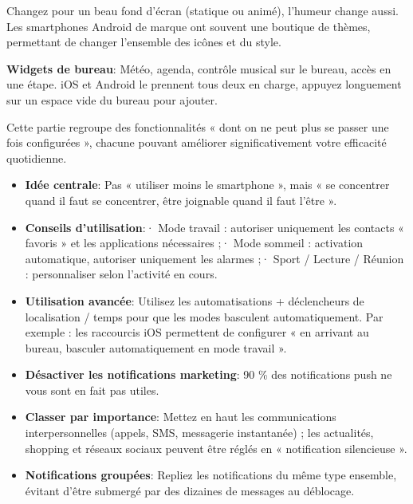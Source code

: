 
Changez pour un beau fond d'écran (statique ou animé), l'humeur change aussi. Les smartphones Android de marque ont souvent une boutique de thèmes, permettant de changer l'ensemble des icônes et du style.

\textbf{Widgets de bureau}: Météo, agenda, contrôle musical sur le bureau, accès en une étape. iOS et Android le prennent tous deux en charge, appuyez longuement sur un espace vide du bureau pour ajouter.


Cette partie regroupe des fonctionnalités « dont on ne peut plus se passer une fois configurées », chacune pouvant améliorer significativement votre efficacité quotidienne.


\begin{itemize}
  \item \textbf{Idée centrale}: Pas « utiliser moins le smartphone », mais « se concentrer quand il faut se concentrer, être joignable quand il faut l'être ».
  \item \textbf{Conseils d'utilisation}:\newline · Mode travail : autoriser uniquement les contacts « favoris » et les applications nécessaires ;\newline · Mode sommeil : activation automatique, autoriser uniquement les alarmes ;\newline · Sport / Lecture / Réunion : personnaliser selon l'activité en cours.
  \item \textbf{Utilisation avancée}: Utilisez les automatisations + déclencheurs de localisation / temps pour que les modes basculent automatiquement. Par exemple : les raccourcis iOS permettent de configurer « en arrivant au bureau, basculer automatiquement en mode travail ».
\end{itemize}


\begin{itemize}
  \item \textbf{Désactiver les notifications marketing}: 90 \% des notifications push ne vous sont en fait pas utiles.
  \item \textbf{Classer par importance}: Mettez en haut les communications interpersonnelles (appels, SMS, messagerie instantanée) ; les actualités, shopping et réseaux sociaux peuvent être réglés en « notification silencieuse ».
  \item \textbf{Notifications groupées}: Repliez les notifications du même type ensemble, évitant d'être submergé par des dizaines de messages au déblocage.
\end{itemize}

